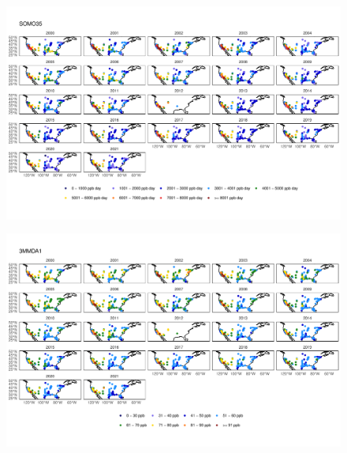 \documentclass{article}
\begin{document}
\begin{figure}
\centering
\includegraphics[height=0.75\textheight]{figures/si_figures/fS18_metric_map_United-States-of-America_SOMO35.pdf}
\caption{}
\label{si_fig:metric_map_us_SOMO35}
\end{figure}
\clearpage

\begin{figure}
\centering
\includegraphics[height=0.75\textheight]{figures/si_figures/fS19_metric_map_United-States-of-America_3MMDA1.pdf}
\caption{}
\label{si_fig:metric_map_us_3MMDA1}
\end{figure}
\clearpage
\end{document}
